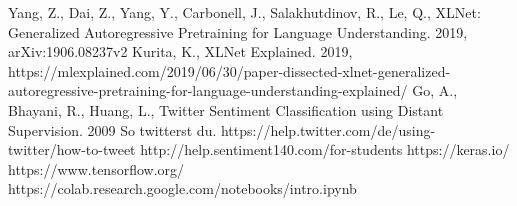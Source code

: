 \documentclass[12pt,german]{report}
\begin{document}
\begin{thebibliography}{}
 Yang, Z., Dai, Z., Yang, Y., Carbonell, J., Salakhutdinov, R., Le, Q., XLNet: Generalized Autoregressive Pretraining
for Language Understanding. 2019, arXiv:1906.08237v2
 Kurita, K., XLNet Explained. 2019,  https://mlexplained.com/2019/06/30/paper-dissected-xlnet-generalized-autoregressive-pretraining-for-language-understanding-explained/ 
 Go, A., Bhayani, R., Huang, L., Twitter Sentiment Classification using Distant Supervision. 2009
 So twitterst du. https://help.twitter.com/de/using-twitter/how-to-tweet
 http://help.sentiment140.com/for-students
 https://keras.io/
 https://www.tensorflow.org/
 https://colab.research.google.com/notebooks/intro.ipynb
\end{thebibliography}
\end{document}
